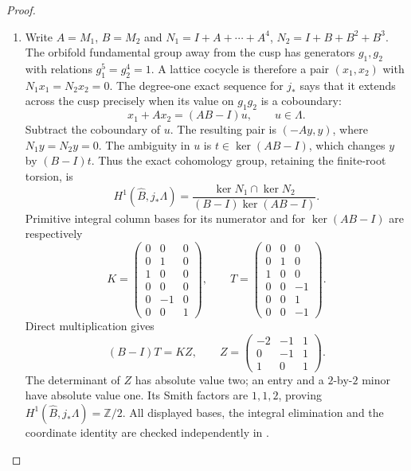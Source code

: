 \begin{proof}
\begin{enumerate}[label=\arabic*.]
To check the last surjectivity at the cusp, lift a translation
to the toroidal cover. It preserves the fan precisely when
its valuation is an integral translation of the periodic
fan. Subtract the corresponding period; the remaining
characters are nonvanishing holomorphic functions on a
disc and possess logarithms. These give a local section
of $E_0$. The kernel consists exactly of the invariant
integral periods. This also proves that the sequence
accounts for all extendable translations, including
possible component permutations.

\item Write $A=M_1$, $B=M_2$ and
$N_1=I+A+\cdots+A^4$, $N_2=I+B+B^2+B^3$.
The orbifold fundamental group away from the cusp has generators
$g_1,g_2$ with relations $g_1^5=g_2^4=1$.  A lattice cocycle is
therefore a pair $(x_1,x_2)$ with $N_1x_1=N_2x_2=0$.
The degree-one exact sequence for $j_*$ says that it extends across
the cusp precisely when its value on $g_1g_2$ is a coboundary:
\[
x_1+Ax_2=(AB-I)u,\qquad u\in\Lambda.
\]
Subtract the coboundary of $u$.  The resulting pair is $(-Ay,y)$,
where $N_1y=N_2y=0$.  The ambiguity in $u$ is
$t\in\ker(AB-I)$, which changes $y$ by $(B-I)t$.
Thus the exact cohomology group, retaining the finite-root torsion, is
\[
H^1(\widehat B,j_*\Lambda)=
\frac{\ker N_1\cap\ker N_2}{(B-I)\ker(AB-I)}.
\]
Primitive integral column bases for its numerator and for
$\ker(AB-I)$ are respectively
\[
K=\begin{pmatrix}
0&0&0\\0&1&0\\1&0&0\\0&0&0\\0&-1&0\\0&0&1
\end{pmatrix},\qquad
T=\begin{pmatrix}
0&0&0\\0&1&0\\1&0&0\\0&0&-1\\0&0&1\\0&0&-1
\end{pmatrix}.
\]
Direct multiplication gives
\[
(B-I)T=KZ,\qquad
Z=\begin{pmatrix}-2&-1&1\\0&-1&1\\1&0&1\end{pmatrix}.
\]
The determinant of $Z$ has absolute value two; an entry and a
$2$-by-$2$ minor have absolute value one.  Its Smith factors are
$1,1,2$, proving $H^1(\widehat B,j_*\Lambda)=\mathbb Z/2$.
All displayed bases, the integral elimination and the coordinate
identity are checked independently in
.


\end{enumerate}
\end{proof}

